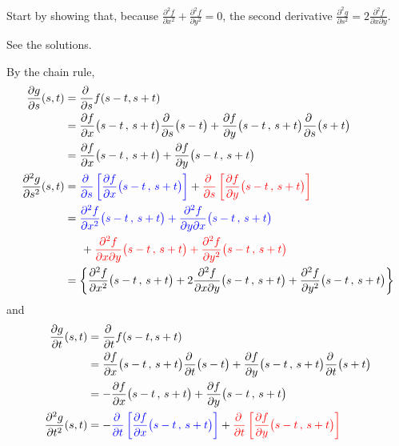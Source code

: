 \begin{hint}
Start by showing that, because
$\frac{\partial^2 f}{\partial x^2}+\frac{\partial^2 f}{\partial y^2}=0$,
the second derivative
$\frac{\partial^2g}{\partial s^2} = 2\frac{\partial^2f}{\partial x \partial y}$.
\end{hint}

\begin{answer}
See the solutions.
\end{answer}

\begin{solution}
By the chain rule,
\begin{align*}
\pdiff{g}{s}(s,t)
&=\pdiff{}{s} f (s - t, s + t) \\
&= \pdiff{f}{x}\big(s-t\,,\,s+t\big)\pdiff{}{s}\big(s-t\big) 
                 +\pdiff{f}{y}\big(s-t\,,\,s+t\big)\pdiff{}{s}\big(s+t\big) \\
&= \pdiff{f}{x}\big(s-t\,,\,s+t\big) 
                    +\pdiff{f}{y}\big(s-t\,,\,s+t\big) \\
\frac{\partial^2 g}{\partial s^2}(s,t)
  &=\textcolor{blue}{\pdiff{}{s}\left[\pdiff{f}{x}\big(s-t\,,\,s+t\big)\right]}
  +\textcolor{red}{\pdiff{}{s}\left[\pdiff{f}{y}\big(s-t\,,\,s+t\big)\right]} \\
  &=\textcolor{blue}{ \frac{\partial^2 f}{\partial x^2}\big(s-t\,,\,s+t\big)
    +\frac{\partial^2 f}{\partial y\partial x}\big(s-t\,,\,s+t\big)} \\
  &\hskip0.2in
 +\textcolor{red}{\frac{\partial^2 f}{\partial x\partial y}\big(s-t\,,\,s+t\big)
    +\frac{\partial^2 f}{\partial y^2}\big(s-t\,,\,s+t\big)} \\
&=\left\{\frac{\partial^2 f}{\partial x^2}\big(s-t\,,\,s+t\big)
 + 2\frac{\partial^2 f}{\partial x\partial y}\big(s-t\,,\,s+t\big)
 +\frac{\partial^2 f}{\partial y^2}\big(s-t\,,\,s+t\big)\right\}
\end{align*}
and
\begin{align*}
\pdiff{g}{t}(s,t)&=\pdiff{}{t} f (s - t, s + t) \\
&= \pdiff{f}{x}\big(s-t\,,\,s+t\big)\pdiff{}{t}\big(s-t\big) 
                 +\pdiff{f}{y}\big(s-t\,,\,s+t\big)\pdiff{}{t}\big(s+t\big) \\
&= -\pdiff{f}{x}\big(s-t\,,\,s+t\big) 
                    +\pdiff{f}{y}\big(s-t\,,\,s+t\big) \\
\frac{\partial^2 g}{\partial t^2}(s,t)
 &=-\textcolor{blue}{\pdiff{}{t}\left[\pdiff{f}{x}\big(s-t\,,\,s+t\big)\right]} 
 +\textcolor{red}{\pdiff{}{t}\left[\pdiff{f}{y}\big(s-t\,,\,s+t\big)\right]} \\

\end{align*}
\end{solution}

